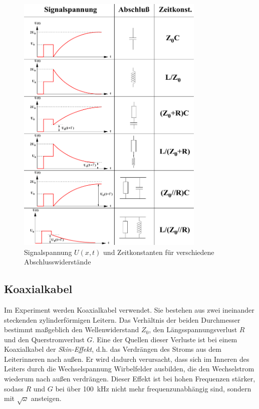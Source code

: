 \begin{figure}[h]
	\centering
	\includegraphics[width=0.8\textwidth]{Zeitkonstante.pdf}
	\caption{Signalspannung $U(x,t)$ und Zeitkonstanten für verschiedene Abschlusswiderstände \cite{E2}}
	\label{fig:Zeitkonstanten}
\end{figure}

\subsection{Koaxialkabel}
Im Experiment werden Koaxialkabel verwendet. Sie bestehen aus zwei ineinander steckenden zylinderförmigen Leitern. Das Verhältnis der beiden Durchmesser bestimmt maßgeblich den Wellenwiderstand $Z_0$, den Längsspannungsverlust $R$ und den Querstromverlust $G$. Eine der Quellen dieser Verluste ist bei einem Koaxialkabel der \textit{Skin-Effekt}, d.h. das Verdrängen des Stroms aus dem Leiterinneren nach außen. Er wird dadurch verursacht, dass sich im Inneren des Leiters durch die Wechselspannung Wirbelfelder ausbilden, die den Wechselstrom wiederum nach außen verdrängen. Dieser Effekt ist bei hohen Frequenzen stärker, sodass $R$ und $G$ bei über \SI{100}{\kilo\hertz} nicht mehr frequenzunabhängig sind, sondern mit $\sqrt{\omega}$ ansteigen.